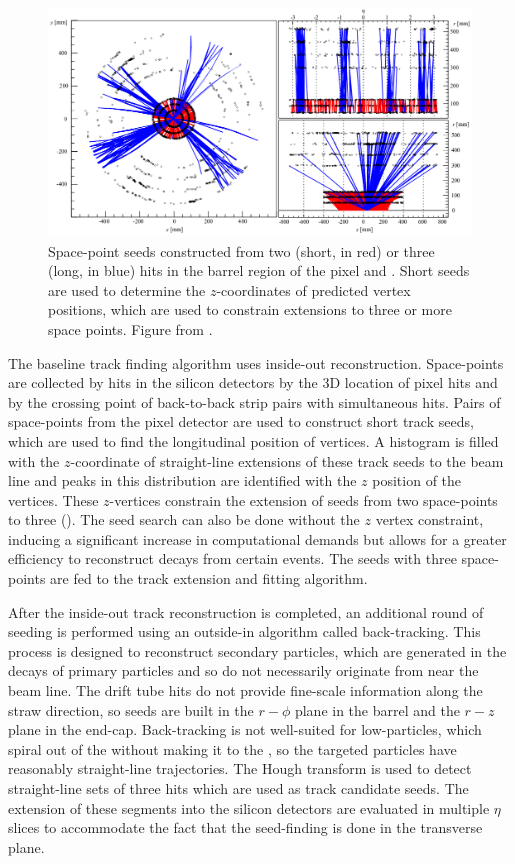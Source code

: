 \begin{figure}[t]
  \includegraphics[width=\linewidth]{soft-pub-2007-007_sp_seeds.png}
  \caption{Space-point seeds constructed from two (short, in red) or three (long, in blue) hits in the barrel region of the pixel and \sct. Short seeds are used to determine the $z$-coordinates of predicted vertex positions, which are used to constrain extensions to three or more space points.  Figure from .}
  \label{fig:trk_seeds}
\end{figure}

The baseline track finding algorithm uses inside-out reconstruction.
Space-points are collected by hits in the silicon detectors by the 3D location of pixel hits and by the crossing point of back-to-back \sct strip pairs with simultaneous hits.
Pairs of space-points from the pixel detector are used to construct short track seeds, which are used to find the longitudinal position of vertices.
A histogram is filled with the $z$-coordinate of straight-line extensions of these track seeds to the beam line and peaks in this distribution are identified with the $z$ position of the vertices.
These $z$-vertices constrain the extension of seeds from two space-points to three ().
The seed search can also be done without the $z$ vertex constraint, inducing a significant increase in computational demands but allows for a greater efficiency to reconstruct decays from certain events.
The seeds with three space-points are fed to the track extension and fitting algorithm.

After the inside-out track reconstruction is completed, an additional round of seeding is performed using an outside-in algorithm called back-tracking.
This process is designed to reconstruct secondary particles, which are generated in the decays of primary particles and so do not necessarily originate from near the beam line.
The \trt drift tube hits do not provide fine-scale information along the straw direction, so seeds are built in the $r - \phi$ plane in the \trt barrel and the $r - z$ plane in the \trt end-cap.
Back-tracking is not well-suited for low-\pt particles, which spiral out of the \id without making it to the \trt, so the targeted particles have reasonably straight-line trajectories.
The Hough transform \cite{Duda:1972:UHT:361237.361242} is used to detect straight-line sets of three \trt hits which are used as track candidate seeds.
The extension of these \trt segments into the silicon detectors are evaluated in multiple $\eta$ slices to accommodate the fact that the seed-finding is done in the transverse plane.

